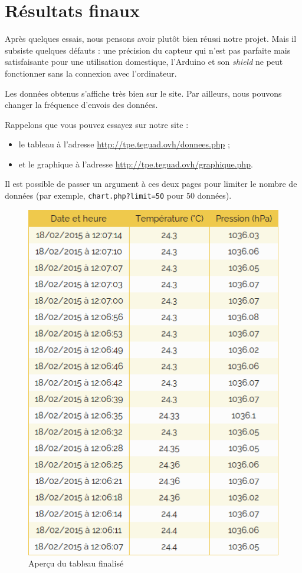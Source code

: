\chapter{Résultats finaux}

Après quelques essais, nous pensons avoir plutôt bien réussi notre projet. Mais il subsiste quelques défauts : une précision du capteur qui n'est pas parfaite mais satisfaisante pour une utilisation domestique, l'Arduino et son \emph{shield} ne peut fonctionner sans la connexion avec l'ordinateur.

Les données obtenus s'affiche très bien sur le site. Par ailleurs, nous pouvons changer la fréquence d'envois des données.

Rappelons que vous pouvez essayez sur notre site :
\begin{itemize}
	\item le tableau à l'adresse \url{http://tpe.teguad.ovh/donnees.php} ;
	\item et le graphique à l'adresse \url{http://tpe.teguad.ovh/graphique.php}.
\end{itemize}
Il est possible de passer un argument à ces deux pages pour limiter le nombre de données (par exemple, \verb-chart.php?limit=50- pour 50 données).

\begin{figure}[!h]
	\centering
	\includegraphics[scale=.6]{Images/Tableau_final}
	\caption{Aperçu du tableau finalisé}
\end{figure}

